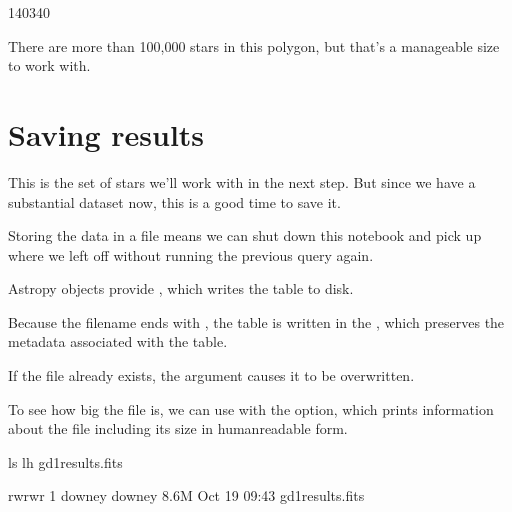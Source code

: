 \documentclass[letterpaper,10pt,english]{sphinxmanual}
\begin{document}
\begin{sphinxVerbatim}[commandchars=\\\{\}]
140340
\end{sphinxVerbatim}

There are more than 100,000 stars in this polygon, but that’s a manageable size to work with.


\section{Saving results}
\label{\detokenize{02_coords:saving-results}}
This is the set of stars we’ll work with in the next step.  But since we have a substantial dataset now, this is a good time to save it.

Storing the data in a file means we can shut down this notebook and pick up where we left off without running the previous query again.

Astropy  objects provide , which writes the table to disk.

\begin{sphinxVerbatim}[commandchars=\\\{\}]
  
 
\end{sphinxVerbatim}

Because the filename ends with , the table is written in the , which preserves the metadata associated with the table.

If the file already exists, the  argument causes it to be overwritten.

To see how big the file is, we can use  with the  option, which prints information about the file including its size in human\sphinxhyphen{}readable form.

\begin{sphinxVerbatim}[commandchars=\\\{\}]
ls \PYGZhy{}lh gd1\PYGZus{}results.fits
\end{sphinxVerbatim}

\begin{sphinxVerbatim}[commandchars=\\\{\}]
\PYGZhy{}rw\PYGZhy{}rw\PYGZhy{}r\PYGZhy{}\PYGZhy{} 1 downey downey 8.6M Oct 19 09:43 gd1\PYGZus{}results.fits
\end{sphinxVerbatim}
\end{document}
